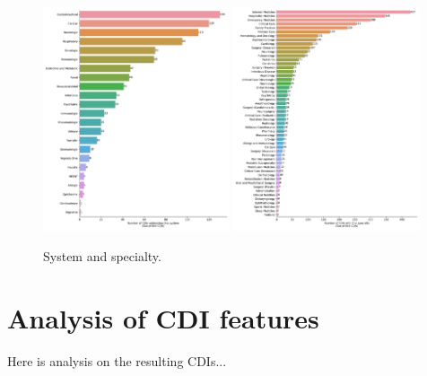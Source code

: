 \documentclass[10pt]{article}
\begin{document}
\begin{figure}[H]
    \centering
    \includegraphics[width=0.49\textwidth]{../results/system_en.pdf}
    \includegraphics[width=0.49\textwidth]{../results/specialty_en.pdf}
    \caption{System and specialty.}
\end{figure}

\section{Analysis of CDI features}

Here is analysis on the resulting CDIs...
\end{document}
